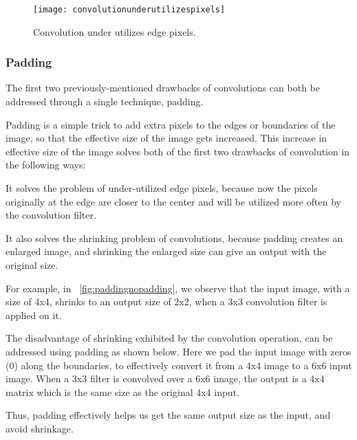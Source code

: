 	\begin{figure}[htb]
		\centering
		\texttt{[image: convolutionunderutilizespixels]}
		\caption[Convolution under utilizes edge pixels]{Convolution under utilizes edge pixels.}
		\label{fig:convolutionunderutilizespixels}
	\end{figure}

	\subsubsection{Padding}

	\begin{bulletedlist}
		\item The first two previously-mentioned drawbacks of convolutions can both be addressed through a single technique, padding.
		\item Padding is a simple trick to add extra pixels to the edges or boundaries of the image, so that the effective size of the image gets increased. This increase in effective size of the image solves both of the first two drawbacks of convolution in the following ways:
		\begin{bulletedlist}
			\item It solves the problem of under-utilized edge pixels, because now the pixels originally at the edge are closer to the center and will be utilized more often by the convolution filter.
			\item It also solves the shrinking problem of convolutions, because padding creates an enlarged image, and shrinking the enlarged size can give an output with the original size.
		\end{bulletedlist}
		\item For example, in \figurename~\ref{fig:paddingnopadding}, we observe that the input image, with a size of 4x4, shrinks to an output size of 2x2, when a 3x3 convolution filter is applied on it.
		\item The disadvantage of shrinking exhibited by the convolution operation, can be addressed using padding as shown below.  Here we pad the input image with zeros (0) along the boundaries, to effectively convert it from a 4x4 image to a 6x6 input image.  When a 3x3 filter is convolved over a 6x6 image, the output is a 4x4 matrix which is the same size as the original 4x4 input.
		\item Thus, padding effectively helps us get the same output size as the input, and avoid shrinkage.
	\end{bulletedlist}

